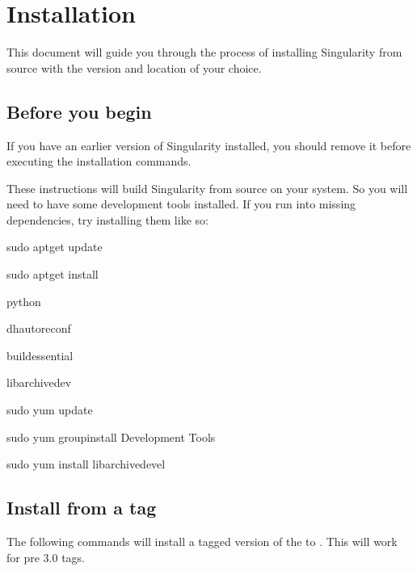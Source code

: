 \documentclass[letterpaper,10pt,english]{sphinxmanual}
\begin{document}
\chapter{Installation}
\label{\detokenize{installation:installation}}\label{\detokenize{installation::doc}}\label{\detokenize{installation:sec-installation}}
This document will guide you through the process of installing
Singularity from source with the version and location of your choice.


\section{Before you begin}
\label{\detokenize{installation:before-you-begin}}
If you have an earlier version of Singularity installed, you should
remove it before executing the installation commands.

These instructions will build Singularity from source on your system.
So you will need to have some development tools installed. If you run
into missing dependencies, try installing them like so:

%
\begin{sphinxVerbatim}[commandchars=\\\{\}]
\PYGZdl{} sudo apt\PYGZhy{}get update \PYGZam{}\PYGZam{} \PYGZbs{}

    sudo apt\PYGZhy{}get install \PYGZbs{}

    python \PYGZbs{}

    dh\PYGZhy{}autoreconf \PYGZbs{}

    build\PYGZhy{}essential \PYGZbs{}

    libarchive\PYGZhy{}dev
\end{sphinxVerbatim}

%
\begin{sphinxVerbatim}[commandchars=\\\{\}]
\PYGZdl{} sudo yum update \PYGZam{}\PYGZam{} \PYGZbs{}

    sudo yum groupinstall \PYGZsq{}Development Tools\PYGZsq{} \PYGZam{}\PYGZam{} \PYGZbs{}

    sudo yum install libarchive\PYGZhy{}devel
\end{sphinxVerbatim}


\section{Install from a tag}
\label{\detokenize{installation:install-from-a-tag}}
The following commands will install a tagged version of the  to .
This will work for pre 3.0 tags.
\end{document}
